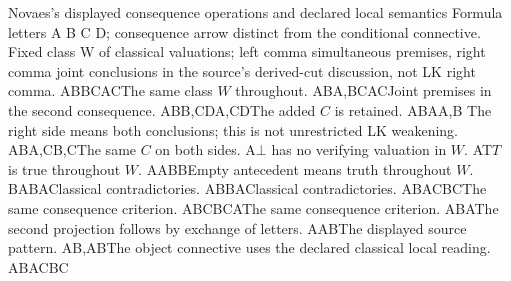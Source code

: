  {Novaes's displayed consequence operations and declared local semantics}
 {Formula letters A B C D; consequence arrow distinct from the conditional connective.
 Fixed class W of classical valuations; left comma simultaneous premises,
 right comma joint conclusions in the source's derived-cut discussion, not LK right comma.}
 {A\Rightarrow B\quad B\Rightarrow C}{A\Rightarrow C}{The same class \(W\) throughout.}
 {A\Rightarrow B\quad A,B\Rightarrow C}{A\Rightarrow C}{Joint premises in the second consequence.}
 {A\Rightarrow B\quad B,C\Rightarrow D}{A,C\Rightarrow D}{The added \(C\) is retained.}
 {A\Rightarrow B}{A\Rightarrow A,B}
 {The right side means both conclusions; this is not unrestricted LK weakening.}
 {A\Rightarrow B}{A,C\Rightarrow B,C}{The same \(C\) on both sides.}
 {}{\bot\Rightarrow A}{\(\bot\) has no verifying valuation in \(W\).}
 {}{A\Rightarrow T}{\(T\) is true throughout \(W\).}
 {\Rightarrow A\quad A\Rightarrow B}{\Rightarrow B}{Empty antecedent means truth throughout \(W\).}
 {\Rightarrow\neg B\quad A\Rightarrow B}{\Rightarrow\neg A}{Classical contradictories.}
 {A\Rightarrow B}{\neg B\Rightarrow\neg A}{Classical contradictories.}
 {A\Rightarrow B\quad\neg A\Rightarrow C}{\neg B\Rightarrow C}{The same consequence criterion.}
 {A\Rightarrow B\quad C\Rightarrow\neg B}{C\Rightarrow\neg A}{The same consequence criterion.}
 {}{A\mathbin{\&}B\Rightarrow A}{The second projection follows by exchange of letters.}
 {}{A\Rightarrow A\lor B}{The displayed source pattern.}
 {}{A\to B,A\Rightarrow B}{The object connective uses the declared classical local reading.}
 {A\Rightarrow B\quad A\nRightarrow C}{B\nRightarrow C}
